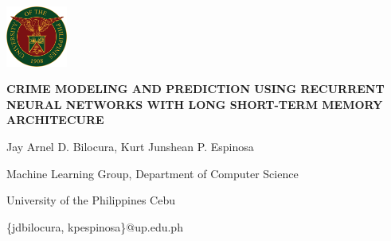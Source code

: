 \documentclass[a0]{sciposter}
\begin{document}
    \begin{center}
    \includegraphics[width=0.15\textwidth]{Unibersidad_ng_Pilipinas}
    \par\Large\MakeUppercase{\textbf{Crime Modeling and Prediction using Recurrent Neural Networks with Long Short-term Memory Architecure}}
    \par Jay Arnel D. Bilocura, Kurt Junshean P. Espinosa
    \par Machine Learning Group, Department of Computer Science
    \par University of the Philippines Cebu
    \par \{jdbilocura, kpespinosa\}@up.edu.ph
    \end{center}
\end{document}
